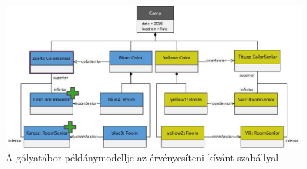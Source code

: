 \begin{figure}[H]
	\centering
	\includegraphics[width=150mm, keepaspectratio]{figures/instance.png}
	\caption{A gólyatábor példánymodellje az érvényesíteni kívánt szabállyal}
	\label{fig:instance}
\end{figure}
